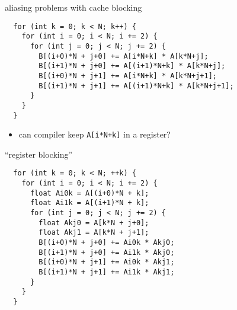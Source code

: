
\begin{frame}[fragile,label=blockingAliasing]{aliasing problems with cache blocking}
\lstset{
    style=small,
    language=C
}
\begin{lstlisting}
  for (int k = 0; k < N; k++) {
    for (int i = 0; i < N; i += 2) {
      for (int j = 0; j < N; j += 2) {
        B[(i+0)*N + j+0] += A[i*N+k] * A[k*N+j];
        B[(i+1)*N + j+0] += A[(i+1)*N+k] * A[k*N+j];
        B[(i+0)*N + j+1] += A[i*N+k] * A[k*N+j+1];
        B[(i+1)*N + j+1] += A[(i+1)*N+k] * A[k*N+j+1];
      }
    }
  }
\end{lstlisting}
\begin{itemize}
    \item can compiler keep \lstinline|A[i*N+k]| in a register?
\end{itemize}
\end{frame}



\begin{frame}[fragile,label=registerBlocking]{``register blocking''}
\lstset{
    style=small,
    language=C
}
\begin{lstlisting}
  for (int k = 0; k < N; ++k) {
    for (int i = 0; i < N; i += 2) {
      float Ai0k = A[(i+0)*N + k];
      float Ai1k = A[(i+1)*N + k];
      for (int j = 0; j < N; j += 2) {
        float Akj0 = A[k*N + j+0];
        float Akj1 = A[k*N + j+1];
        B[(i+0)*N + j+0] += Ai0k * Akj0;
        B[(i+1)*N + j+0] += Ai1k * Akj0;
        B[(i+0)*N + j+1] += Ai0k * Akj1;
        B[(i+1)*N + j+1] += Ai1k * Akj1;
      }
    }
  }
\end{lstlisting}
\end{frame}

